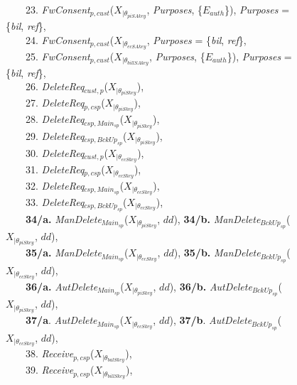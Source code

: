 \documentclass[a4paper]{article}
\begin{document}
\begin{figure}[htbp]
{\begin{minipage}{15.87 cm}
\begin{tabbing}
\ \ \ \ 23. \textit{FwConsent}$_{p,cust}$($X_{|\theta_{piSAkey}}$, \textit{Purposes}, \{$E_{auth}$\}), \textit{Purposes} = \{\textit{bil},  \textit{ref}\},\\ 
\ \ \ \ 24. \textit{FwConsent}$_{p,cust}$($X_{|\theta_{ecSAkey}}$,  \textit{Purposes} = \{\textit{bil},  \textit{ref}\},\\ 
\ \ \ \ 25. \textit{FwConsent}$_{p,cust}$($X_{|\theta_{billSAkey}}$, \textit{Purposes}, \{$E_{auth}$\}),  \textit{Purposes} = \{\textit{bil},  \textit{ref}\},\\ 
\ \ \ \ 26. \textit{DeleteReq}$_{cust, p}$($X_{|\theta_{piSkey}}$),\\
\ \ \ \ 27. \textit{DeleteReq}$_{p, csp}$($X_{|\theta_{piSkey}}$),\\
\ \ \ \ 28. \textit{DeleteReq}$_{csp, \textit{Main}_{sp}}$($X_{|\theta_{piSkey}}$),\\
\ \ \ \ 29. \textit{DeleteReq}$_{csp, \textit{BckUp}_{sp}}$($X_{|\theta_{piSkey}}$),\\
\ \ \ \ 30. \textit{DeleteReq}$_{cust, p}$($X_{|\theta_{ecSkey}}$),\\
\ \ \ \ 31. \textit{DeleteReq}$_{p, csp}$($X_{|\theta_{ecSkey}}$),\\
\ \ \ \ 32. \textit{DeleteReq}$_{csp, \textit{Main}_{sp}}$($X_{|\theta_{ecSkey}}$),\\
\ \ \ \ 33. \textit{DeleteReq}$_{csp, \textit{BckUp}_{sp}}$($X_{|\theta_{ecSkey}}$),\\
\ \ \ \ \textbf{34/a.} \textit{ManDelete}$_{\textit{Main}_{sp}}$($X_{|\theta_{piSkey}}$, $dd$), \textbf{34/b.} \textit{ManDelete}$_{\textit{BckUp}_{sp}}$($X_{|\theta_{piSkey}}$, $dd$),\\
\ \ \ \ \textbf{35/a.} \textit{ManDelete}$_{\textit{Main}_{sp}}$($X_{|\theta_{ecSkey}}$, $dd$), \textbf{35/b.} \textit{ManDelete}$_{\textit{BckUp}_{sp}}$($X_{|\theta_{ecSkey}}$, $dd$),\\
\ \ \ \ \textbf{36/a.} \textit{AutDelete}$_{\textit{Main}_{sp}}$($X_{|\theta_{piSkey}}$, $dd$), \textbf{36/b.} \textit{AutDelete}$_{\textit{BckUp}_{sp}}$($X_{|\theta_{piSkey}}$, $dd$),\\
\ \ \ \ \textbf{37/a}. \textit{AutDelete}$_{\textit{Main}_{sp}}$($X_{|\theta_{ecSkey}}$, $dd$), \textbf{37/b}. \textit{AutDelete}$_{\textit{BckUp}_{sp}}$($X_{|\theta_{ecSkey}}$, $dd$),\\
\ \ \ \ 38. \textit{Receive}$_{p,csp}$($X_{|\theta_{balSkey}}$),\\ 
\ \ \ \ 39. \textit{Receive}$_{p,csp}$($X_{|\theta_{billSkey}}$),\\  

\end{tabbing}
\end{minipage}}
\end{figure}
\end{document}
